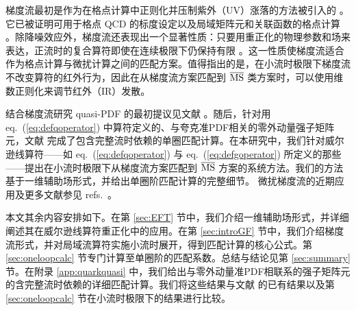 梯度流最初是作为在格点计算中正则化并压制紫外（UV）涨落的方法被引入的 \cite{Narayanan:2006rf,Luscher:2009eq}。它已被证明可用于格点 QCD 的标度设定以及局域矩阵元和关联函数的格点计算 \cite{Luscher:2010iy,Luscher:2011bx,Luscher:2013cpa,Luscher:2013vga,Borsanyi:2012zs,Sommer:2014mea,Suzuki:2013gza,Makino:2014taa,Harlander:2018zpi,FlavourLatticeAveragingGroupFLAG:2021npn,Leino:2021vop,Mayer-Steudte:2022uih,Leino:2022kgj}。除降噪效应外，梯度流还表现出一个显著性质：只要用重正化的物理参数和场来表达，正流时的复合算符即使在连续极限下仍保持有限 \cite{Luscher:2011bx}。这一性质使梯度流适合作为格点计算与微扰计算之间的匹配方案。值得指出的是，在小流时极限下梯度流不改变算符的红外行为，因此在从梯度流方案匹配到 $\overline{\rm MS}$ 类方案时，可以使用维数正则化来调节红外（IR）发散。

结合梯度流研究 quasi-PDF 的最初提议见文献 \cite{Monahan:2016bvm}。随后，针对用 eq.~(\ref{eq:defqoperator}) 中算符定义的、与夸克准PDF相关的零外动量强子矩阵元，文献 \cite{Monahan:2017hpu} 完成了包含完整流时依赖的单圈匹配计算。在本研究中，我们针对威尔逊线算符——如 eq.~(\ref{eq:defqoperator}) 与 eq.~(\ref{eq:defgoperator}) 所定义的那些——提出在小流时极限下从梯度流方案匹配到 $\overline{\rm MS}$ 方案的系统方法。我们的方法基于一维辅助场形式，并给出单圈阶匹配计算的完整细节。
微扰梯度流的近期应用及更多文献参见 refs.~\cite{Artz:2019bpr,Rizik:2020naq,Suzuki:2020zue,Harlander:2020duo,Boers:2020uqr,Shindler:2021bcx,Harlander:2022tgk,Mereghetti:2021nkt,Harlander:2022vgf,Brambilla:2021egm,Crosas:2023anw}。

本文其余内容安排如下。在第 \ref{sec:EFT} 节中，我们介绍一维辅助场形式，并详细阐述其在威尔逊线算符重正化中的应用。在第 \ref{sec:introGF} 节中，我们介绍梯度流形式，并对局域流算符实施小流时展开，得到匹配计算的核心公式。第 \ref{sec:oneloopcalc} 节专门计算至单圈阶的匹配系数。总结与结论见第 \ref{sec:summary} 节。在附录 \ref{app:quarkquasi} 中，我们给出与零外动量准PDF相联系的强子矩阵元的含完整流时依赖的详细匹配计算。我们将这些结果与文献 \cite{Monahan:2017hpu} 的已有结果以及第 \ref{sec:oneloopcalc} 节在小流时极限下的结果进行比较。
